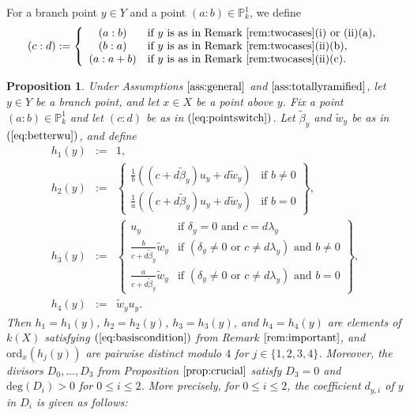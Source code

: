 \documentclass{amsart}
\numberwithin{equation}{section}
\numberwithin{table}{section}
\theoremstyle{plain}
\newtheorem{proposition}[theorem]{Proposition}
\theoremstyle{definition}
\theoremstyle{remark}
\begin{document}
For a branch point $y\in Y$ and a point $(a:b)\in \mathbb{P}^1_k$, we define
\begin{equation}
\label{eq:pointswitch}
(c:d):=\left\{\begin{array}{cl} (a:b)&\mbox{if $y$ is as in Remark \ref{rem:twocases}(i) or (ii)(a)},\\
(b:a)&\mbox{if $y$ is as in Remark \ref{rem:twocases}(ii)(b)},\\
(a:a+b)&\mbox{if $y$ is as in Remark \ref{rem:twocases}(ii)(c)}.
\end{array}\right.
\end{equation}


\begin{proposition}
\label{prop:totallyramified}
Under Assumptions $\ref{ass:general}$ and $\ref{ass:totallyramified}$, let $y\in Y$ be a branch point, and let $x\in X$ be a point above $y$. Fix a point $(a:b)\in \mathbb{P}^1_k$ and let $(c:d)$ be as in $(\ref{eq:pointswitch})$.
Let $\widetilde{\beta}_y$ and $\widetilde{w}_y$ be as in $(\ref{eq:betterwu})$, and define
\begin{eqnarray*}
h_1(y)&:=&1,\\
h_2(y)&:=&\left\{\begin{array}{ll}\frac{1}{b}((c+d\widetilde{\beta}_y)u_y+d\widetilde{w}_y)&\mbox{if } b\ne 0 \\ \frac{1}{a}((c+d\widetilde{\beta}_y)u_y+d\widetilde{w}_y)&\mbox{if } b=0\end{array}\right\},\\
h_3(y)&:=&\left\{\begin{array}{ll}u_y&\mbox{if } \delta_y=0 \mbox{ and } c=d\lambda_y\\ \frac{b}{c+d\widetilde{\beta}_y}\widetilde{w}_y &\mbox{if }(\delta_y\ne 0 \mbox{ or } c\ne d\lambda_y)\mbox{ and }b\ne 0\\  \frac{a}{c+d\widetilde{\beta}_y}\widetilde{w}_y &\mbox{if }(\delta_y\ne 0 \mbox{ or } c\ne d\lambda_y)\mbox{ and }b= 0\end{array}\right\},\\
h_4(y)&:=&\widetilde{w}_yu_y.
\end{eqnarray*}
Then $h_1=h_1(y)$, $h_2=h_2(y)$, $h_3=h_3(y)$, and $h_4=h_4(y)$ are elements of $k(X)$ satisfying $(\ref{eq:basiscondition})$ from Remark $\ref{rem:important}$, and $\mathrm{ord}_x(h_j(y))$ are pairwise distinct modulo $4$ for $j\in\{1,2,3,4\}$. Moreover, the divisors $D_0,\ldots,D_3$ from Proposition $\ref{prop:crucial}$ satisfy $D_3=0$ and $\mathrm{deg}(D_i)>0$ for $0\le i \le 2$. More precisely, for $0\le i \le 2$, the coefficient $d_{y,i}$ of $y$ in $D_i$ is given as follows:

\end{proposition}
\end{document}
